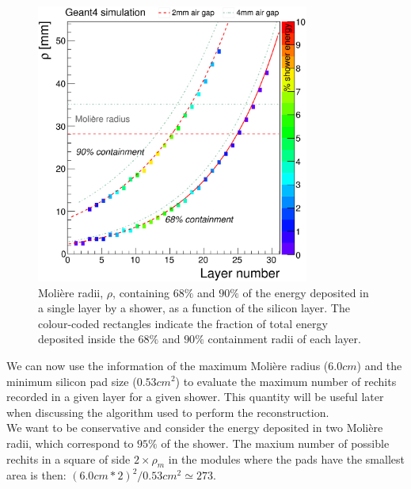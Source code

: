 \begin{figure}
\centerline{\includegraphics[width=0.8\textwidth]{intro/moliereHgcal.png}}
\caption{Molière radii, $\rho$, containing $68\%$ and $90\%$ of the energy deposited in a single layer by a shower, as a function of the silicon layer. The colour-coded rectangles indicate
the fraction of total energy deposited inside the $68\%$ and $90\%$ containment radii of each layer.}
\label{moliereHgcal}
\end{figure}
\clearpage

We can now use the information of the maximum Molière radius ($6.0 \unit{cm}$) and the minimum silicon pad size ($0.53 \unit{cm^2}$) to evaluate the maximum number of rechits recorded in a given layer for a given shower. This quantity will be useful later when discussing the algorithm used to perform the reconstruction.\\
We want to be conservative and consider the energy deposited in two Molière radii, which correspond to $95\%$ of the shower. The maxium number of possible rechits in a square of side $2 \times \rho_m$ in the modules where the pads have the smallest area is then: $(6.0 \unit{cm} * 2)^2/0.53 \unit{cm^2} \simeq 273$.

